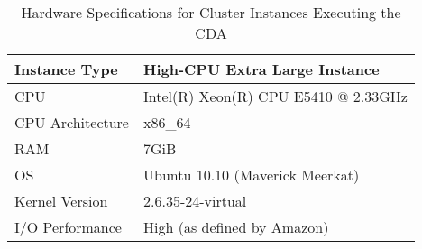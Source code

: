 \begin{table}[!h]
    \centering
    \caption{Hardware Specifications for Cluster Instances Executing the \ac{CDA}}
    \label{tab:hwcda}
    \begin{tabular}{| l | l |}
	\hline
	Instance Type       &High-CPU Extra Large Instance\\
	\hline
	CPU		            &Intel(R) Xeon(R) CPU E5410 @ 2.33GHz\\
	\hline
	CPU Architecture    &x86\_64\\
	\hline
	RAM		            &7GiB\\
	\hline
	OS		            &Ubuntu 10.10 (Maverick Meerkat)\\
	\hline
	Kernel Version	    &2.6.35-24-virtual\\
	\hline
	I/O Performance	    &High (as defined by Amazon)\\
	\hline
    \end{tabular}
\end{table}
